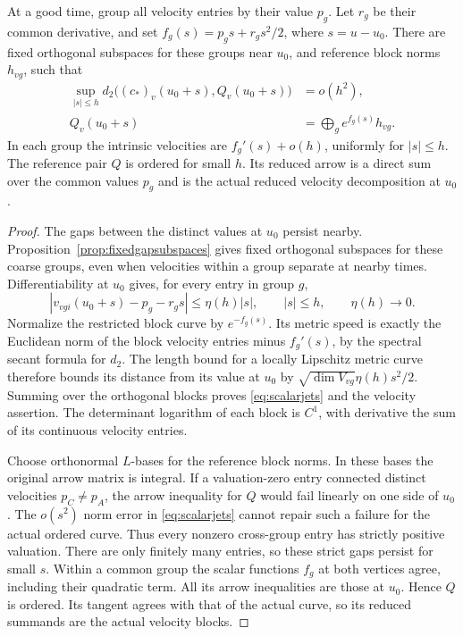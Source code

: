 \begin{proposition}\label{prop:scalarjets}
At a good time, group all velocity entries by their value $p_g$.
Let $r_g$ be their common derivative, and set
$f_g(s)=p_gs+r_gs^2/2$, where $s=u-u_0$. There are fixed orthogonal
subspaces for these groups near $u_0$, and reference block norms
$h_{vg}$, such that
\begin{equation}\label{eq:scalarjets}
 \begin{split}
 \sup_{|s|\le h}d_2\bigl((c_*)_v(u_0+s),Q_v(u_0+s)\bigr)&=o(h^2),\\
 Q_v(u_0+s)&=\bigoplus_g e^{f_g(s)}h_{vg}.
 \end{split}
\end{equation}
In each group the intrinsic velocities are $f_g'(s)+o(h)$,
uniformly for $|s|\le h$. The reference pair $Q$ is ordered for
small $h$. Its reduced arrow is a direct sum over the common
values $p_g$ and is the actual reduced velocity decomposition at
$u_0$.
\end{proposition}

\begin{proof}
The gaps between the distinct values at $u_0$ persist nearby.
Proposition~\ref{prop:fixedgapsubspaces} gives fixed orthogonal
subspaces for these coarse groups, even when velocities within a
group separate at nearby times. Differentiability at $u_0$ gives,
for every entry in group $g$,
\[
 |v_{vgi}(u_0+s)-p_g-r_gs|\le\eta(h)|s|,
 \qquad |s|\le h,\qquad\eta(h)\to0.
\]
Normalize the restricted block curve by $e^{-f_g(s)}$. Its metric
speed is exactly the Euclidean norm of the block velocity entries
minus $f_g'(s)$, by the spectral secant formula for $d_2$.
The length bound for a locally Lipschitz metric curve therefore
bounds its distance from its value at $u_0$ by
$\sqrt{\dim V_{vg}}\eta(h)s^2/2$. Summing over the orthogonal
blocks proves \eqref{eq:scalarjets} and the velocity assertion.
The determinant logarithm of each block is $C^1$, with derivative
the sum of its continuous velocity entries.

Choose orthonormal $L$-bases for the reference block norms. In
these bases the original arrow matrix is integral. If a valuation-zero
entry connected distinct velocities $p_C\ne p_A$, the arrow
inequality for $Q$ would fail linearly on one side of $u_0$.
The $o(s^2)$ norm error in \eqref{eq:scalarjets} cannot repair
such a failure for the actual ordered curve. Thus every nonzero
cross-group entry has strictly positive valuation. There are only
finitely many entries, so these strict gaps persist for small $s$.
Within a common group the scalar functions $f_g$ at both vertices
agree, including their quadratic term. All its arrow inequalities
are those at $u_0$. Hence $Q$ is ordered. Its tangent agrees with
that of the actual curve, so its reduced summands are the actual
velocity blocks.
\end{proof}

